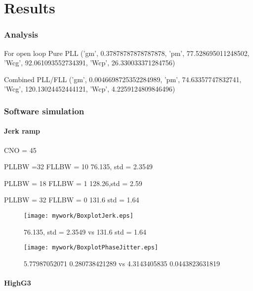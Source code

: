 \chapter{Results}\label{ch:Results}

\subsection{Analysis}

For open loop
Pure PLL
('gm', 0.37878787878787878, 'pm', 77.528695011248502, 'Wcg', 92.061093552734391, 'Wcp', 26.330033371284756)

Combined PLL/FLL
('gm', 0.0046698725352284989, 'pm', 74.63357747832741, 'Wcg', 120.13024452444121, 'Wcp', 4.2259124809846496)


\subsection{Software simulation}

\subsubsection{Jerk ramp}
CNO = 45

PLLBW =32
FLLBW = 10
76.135, std = 2.3549

PLLBW = 18
FLLBW = 1
128.26,std =  2.59 

PLLBW = 32
FLLBW = 0
131.6 std = 1.64

\begin{figure}[!htb] 
    \centering
    \texttt{[image: mywork/BoxplotJerk.eps]} 
    \caption{ 76.135, std = 2.3549 vs 131.6 std = 1.64}
    \label{fig:BoxplotJerk}
\end{figure}

\begin{figure}[!htb] 
    \centering
    \texttt{[image: mywork/BoxplotPhaseJitter.eps]} 
    \caption{5.77987052071 0.280738421289 vs 4.3143405835 0.0443823631819}
    \label{fig:BoxplotPhaseJitter}
\end{figure}

\subsubsection{HighG3}

